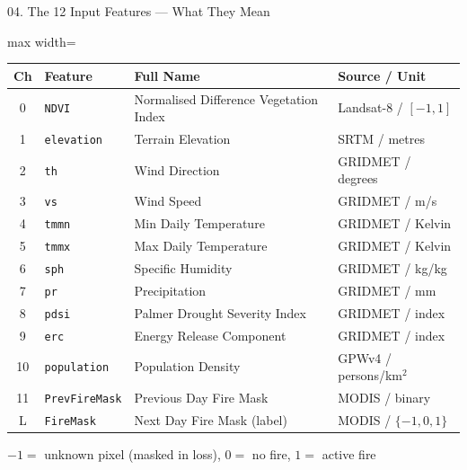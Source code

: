 ﻿\documentclass[aspectratio=169,t]{beamer}
\begin{document}
\begin{frame}{04. The 12 Input Features --- What They Mean}
\begin{adjustbox}{max width=\textwidth}
\small
\begin{tabular}{clll}
\toprule
\textcolor{accent}{\textbf{Ch}} & \textcolor{accent}{\textbf{Feature}} & \textcolor{accent}{\textbf{Full Name}} & \textcolor{accent}{\textbf{Source / Unit}} \\
\midrule
0  & \texttt{NDVI}         & Normalised Difference Vegetation Index & Landsat-8 / $[-1,1]$ \\
1  & \texttt{elevation}    & Terrain Elevation                       & SRTM / metres \\
2  & \texttt{th}           & Wind Direction                          & GRIDMET / degrees \\
3  & \texttt{vs}           & Wind Speed                              & GRIDMET / m/s \\
4  & \texttt{tmmn}         & Min Daily Temperature                   & GRIDMET / Kelvin \\
5  & \texttt{tmmx}         & Max Daily Temperature                   & GRIDMET / Kelvin \\
6  & \texttt{sph}          & Specific Humidity                       & GRIDMET / kg/kg \\
7  & \texttt{pr}           & Precipitation                           & GRIDMET / mm \\
8  & \texttt{pdsi}         & Palmer Drought Severity Index           & GRIDMET / index \\
9  & \texttt{erc}          & Energy Release Component                & GRIDMET / index \\
10 & \texttt{population}   & Population Density                      & GPWv4 / persons/km$^2$ \\
11 & \texttt{PrevFireMask} & Previous Day Fire Mask                  & MODIS / binary \\
\midrule
\textcolor{firered}{L} & \textcolor{firered}{\texttt{FireMask}} & \textcolor{firered}{Next Day Fire Mask (label)} & \textcolor{firered}{MODIS / $\{-1,0,1\}$} \\
\bottomrule
\end{tabular}
\end{adjustbox}
\vspace{0.2cm}
\textcolor{textsecondary}{\small $-1=$ unknown pixel (masked in loss), $0=$ no fire, $1=$ active fire}
\end{frame}
\end{document}
